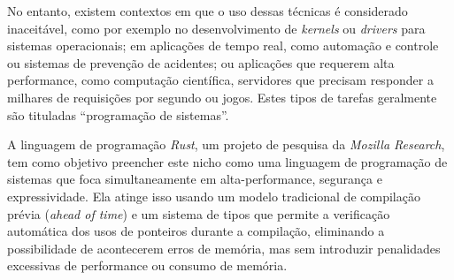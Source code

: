 \documentclass[12pt]{article}
\begin{document}
No entanto, existem contextos em que o uso dessas técnicas é considerado inaceitável, como por exemplo no desenvolvimento de \emph{kernels} ou \emph{drivers} para sistemas operacionais; em aplicações de tempo real, como automação e controle ou sistemas de prevenção de acidentes; ou aplicações que requerem alta performance, como computação científica, servidores que precisam responder a milhares de requisições por segundo ou jogos. Estes tipos de tarefas geralmente são tituladas ``programação de sistemas''.

A linguagem de programação \emph{Rust}, um projeto de pesquisa da \emph{Mozilla Research}, tem como objetivo preencher este nicho como uma linguagem de programação de sistemas que foca simultaneamente em alta-performance, segurança e expressividade. Ela atinge isso usando um modelo tradicional de compilação prévia (\emph{ahead of time}) e um sistema de tipos que permite a verificação automática dos usos de ponteiros durante a compilação, eliminando a possibilidade de acontecerem erros de memória, mas sem introduzir penalidades excessivas de performance ou consumo de memória.
\end{document}
